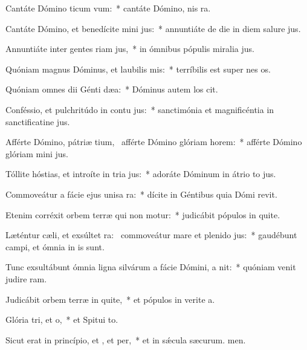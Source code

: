 \item Cantáte Dómino ticum vum:~* cantáte Dómino, nis ra.
\item Cantáte Dómino, et benedícite mini jus:~* annuntiáte de die in diem salure jus.
\item Annuntiáte inter gentes riam jus,~* in ómnibus pópulis miralia jus.
\item Quóniam magnus Dóminus, et laubilis mis:~* terríbilis est super nes os.
\item Quóniam omnes dii Génti dæa:~* Dóminus autem los cit.
\item Conféssio, et pulchritúdo in contu jus:~* sanctimónia et magnificéntia in sanctificatine jus.
\item Afférte Dómino, pátriæ tium,~\pscross{} afférte Dómino glóriam  horem:~* afférte Dómino glóriam mini jus.
\item Tóllite hóstias, et introíte in tria jus:~* adoráte Dóminum in átrio to jus.
\item Commoveátur a fácie ejus unisa ra:~* dícite in Géntibus quia Dómi revit.
\item Etenim corréxit orbem terræ qui non motur:~* judicábit pópulos in quite.
\item Læténtur cæli, et exsúltet ra:~\pscross{} commoveátur mare et plenido jus:~* gaudébunt campi, et ómnia  in is sunt.
\item Tunc exsultábunt ómnia ligna silvárum a fácie Dómini, a nit:~* quóniam venit judire ram.
\item Judicábit orbem terræ in quite,~* et pópulos in verite a.
\item Glória tri, et o,~* et Spitui to.
\item Sicut erat in princípio, et , et per,~* et in sǽcula sæcurum. men.
